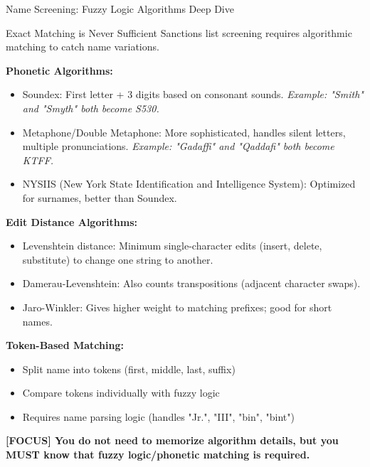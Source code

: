 \documentclass[11pt,a4paper]{beamer}
\newcommand{\examfocus}[1]{\textcolor{orange!80!black}{\textbf{[FOCUS] #1}}}
\begin{document}
\begin{frame}{Name Screening: Fuzzy Logic Algorithms Deep Dive}
	\begin{block}{Exact Matching is Never Sufficient}
		Sanctions list screening requires algorithmic matching to catch name variations.
	\end{block}
	\textbf{Phonetic Algorithms:}
	\begin{itemize}
		\item Soundex: First letter + 3 digits based on consonant sounds. \textit{Example: "Smith" and "Smyth" both become S530.}
		\item Metaphone/Double Metaphone: More sophisticated, handles silent letters, multiple pronunciations. \textit{Example: "Gadaffi" and "Qaddafi" both become KTFF.}
		\item NYSIIS (New York State Identification and Intelligence System): Optimized for surnames, better than Soundex.
	\end{itemize}
	\textbf{Edit Distance Algorithms:}
	\begin{itemize}
		\item Levenshtein distance: Minimum single-character edits (insert, delete, substitute) to change one string to another.
		\item Damerau-Levenshtein: Also counts transpositions (adjacent character swaps).
		\item Jaro-Winkler: Gives higher weight to matching prefixes; good for short names.
	\end{itemize}
	\textbf{Token-Based Matching:}
	\begin{itemize}
		\item Split name into tokens (first, middle, last, suffix)
		\item Compare tokens individually with fuzzy logic
		\item Requires name parsing logic (handles "Jr.", "III", "bin", "bint")
	\end{itemize}
	\examfocus{You do not need to memorize algorithm details, but you MUST know that fuzzy logic/phonetic matching is required.}
\end{frame}
\end{document}

